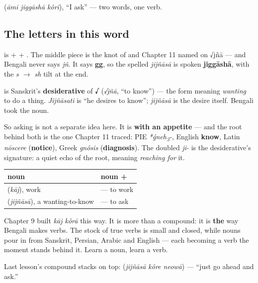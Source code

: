    (\emph{āmi jiggāshā kôri}), \textquotedblleft{}I ask\textquotedblright{} — two words, one verb.

\subsection*{The letters in this word}
\textbf{} is \textbf{} + \textbf{} + \textbf{}. The middle piece \textbf{} is the knot of \textbf{} and \textbf{} Chapter 11 named on √jñā — and Bengali never says \emph{jñ}. It says \textbf{gg}, so the spelled \emph{jijñāsā} is spoken \textbf{jiggāshā}, with the \emph{s $\to$ sh} tilt at the end.

\begin{cousinweb}
\textbf{} is Sanskrit's \textbf{desiderative} of \textbf{√} (\emph{√jñā}, \textquotedblleft{}to know\textquotedblright{}) — the form meaning \emph{wanting} to do a thing. \emph{Jijñāsati} is \textquotedblleft{}he desires to know\textquotedblright{}; \emph{jijñāsā} is the desire itself. Bengali took the noun.

So asking is not a separate idea here. It is \textbf{ with an appetite} — and the root behind both is the one Chapter 11 traced: PIE \emph{*ǵneh\textsubscript{3}-}, English \textbf{know}, Latin \emph{nōscere} (\textbf{notice}), Greek \emph{gnôsis} (\textbf{diagnosis}). The doubled \emph{ji-} is the desiderative's signature: a quiet echo of the root, meaning \emph{reaching for} it.
\end{cousinweb}

\begin{grammarlens}[title={Grammar Lens: any noun plus \bn{করা} is a verb}]
\noindent
\begin{tabularx}{\linewidth}{@{}>{\raggedright\arraybackslash}X>{\raggedright\arraybackslash}X@{}}
\toprule
\textbf{noun} & \textbf{noun + \bn{করা}} \\
\midrule
\bn{কাজ} (\emph{kāj}), work & \bn{কাজ} \bn{করা} — to work \\
\bn{জিজ্ঞাসা} (\emph{jijñāsā}), a wanting-to-know & \bn{জিজ্ঞাসা} \bn{করা} — to ask \\
\bottomrule
\end{tabularx}

Chapter 9 built \emph{kāj kôrā} this way. It is more than a compound: it is \textbf{the} way Bengali makes verbs. The stock of true verbs is small and closed, while nouns pour in from Sanskrit, Persian, Arabic and English — each becoming a verb the moment  stands behind it. Learn a noun, learn a verb.

Last lesson’s compound stacks on top: \textbf{  } (\emph{jijñāsā kôre neowā}) — \textquotedblleft{}just go ahead and ask.\textquotedblright{}
\end{grammarlens}

